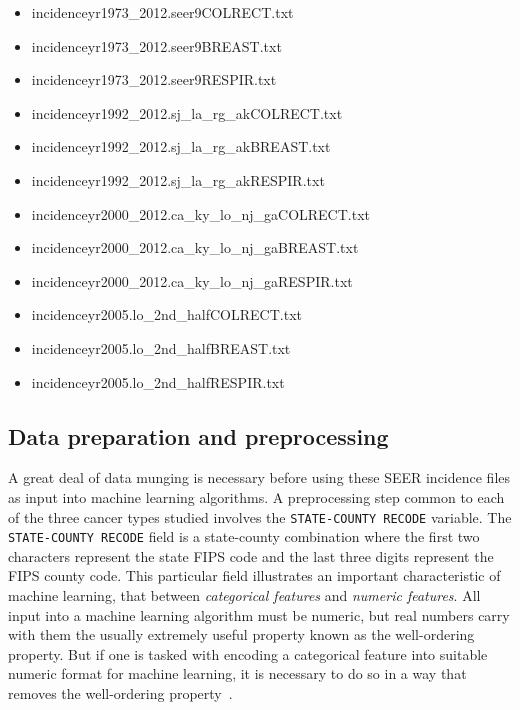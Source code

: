 \documentclass[a4paper,11pt]{article}
\newcommand{\codewhite}[1]{\colorbox{white}{\texttt{#1}}}
\begin{document}
\begin{itemize}[noitemsep]
\item incidenceyr1973\_2012.seer9COLRECT.txt
\item incidenceyr1973\_2012.seer9BREAST.txt
\item incidenceyr1973\_2012.seer9RESPIR.txt
\item incidenceyr1992\_2012.sj\_la\_rg\_akCOLRECT.txt
\item incidenceyr1992\_2012.sj\_la\_rg\_akBREAST.txt
\item incidenceyr1992\_2012.sj\_la\_rg\_akRESPIR.txt
\item incidenceyr2000\_2012.ca\_ky\_lo\_nj\_gaCOLRECT.txt
\item incidenceyr2000\_2012.ca\_ky\_lo\_nj\_gaBREAST.txt
\item incidenceyr2000\_2012.ca\_ky\_lo\_nj\_gaRESPIR.txt
\item incidenceyr2005.lo\_2nd\_halfCOLRECT.txt
\item incidenceyr2005.lo\_2nd\_halfBREAST.txt
\item incidenceyr2005.lo\_2nd\_halfRESPIR.txt
\end{itemize}



\subsection{Data preparation and preprocessing}
\label{subsec:dataprep}

A great deal of data munging is necessary before using these SEER incidence files as input into machine learning algorithms. A preprocessing step common to each of the three cancer types studied involves the \codewhite{STATE-COUNTY RECODE} variable.
The \codewhite{STATE-COUNTY RECODE} field is a state-county combination where the first two characters represent the state FIPS code and the last three digits represent the FIPS county code.  
This particular field illustrates an important characteristic of machine learning, that between \textit{categorical features} and \textit{numeric features}. All input into a machine learning algorithm must be numeric, but real numbers carry with them the usually extremely useful property known as the well-ordering property. But if one is tasked with encoding a categorical feature into suitable numeric format for machine learning, it is necessary to do so in a way that removes the well-ordering property~\cite{bowles}. 
\end{document}
